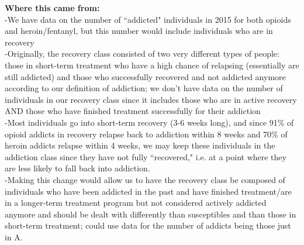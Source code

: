 \documentclass[12pt]{article}
\begin{document}
\textbf{Where this came from:} \\
-We have data on the number of ``addicted" individuals in 2015 for both opioids and heroin/fentanyl, but  this number would include individuals who are in recovery \\
-Originally, the recovery class consisted of two very different types of people: those in short-term treatment who have a high chance of relapsing (essentially are still addicted) and those who successfully recovered and not addicted anymore according to our definition of addiction; we don't have data on the number of individuals in our recovery class since it includes those who are in active recovery AND those who have finished treatment successfully for their addiction \\
-Most individuals go into short-term recovery (3-6 weeks long), and since 91\% of opioid addicts in recovery relapse back to addiction within 8 weeks and 70\% of heroin addicts relapse within 4 weeks, we may keep these individuals in the addiction class since they have not fully ``recovered," i.e. at a point where they are less likely to fall back into addiction. \cite{NIH4, SAMSHA4} \\
-Making this change would allow us to have the recovery class be composed of individuals who have been addicted in the past and have finished treatment/are in a longer-term treatment program but not considered actively addicted anymore and should be dealt with differently than susceptibles and than those in short-term treatment; could use data for the number of addicts being those just in A. \\ \\





\pagebreak


\end{document}
